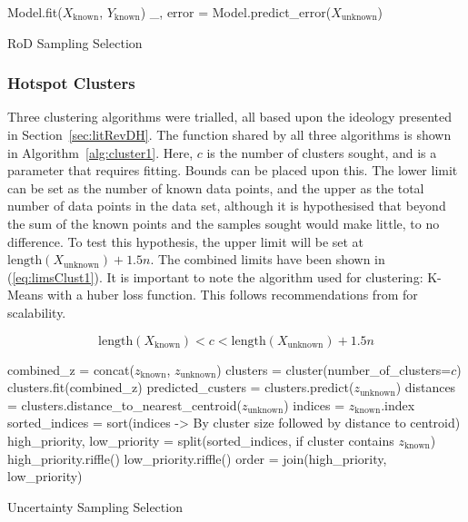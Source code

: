 \begin{algorithm}[H]
    Model.fit($X_\mathrm{known}$, $Y_\mathrm{known}$)\;
    \_, error = Model.predict\_error($X_\mathrm{unknown}$)\;
    \caption{RoD Sampling Selection}
    \label{alg:rod}\SetAlgoLined
\end{algorithm}

\subsubsection{Hotspot Clusters}
Three clustering algorithms were trialled, all based upon the ideology presented in Section~\ref{sec:litRevDH}. The function shared by all three algorithms is shown in Algorithm~\ref{alg:cluster1}. Here, $c$ is the number of clusters sought, and is a parameter that requires fitting. Bounds can be placed upon this. The lower limit can be set as the number of known data points, and the upper as the total number of data points in the data set, although it is hypothesised that beyond the sum of the known points and the samples sought would make little, to no difference. To test this hypothesis, the upper limit will be set at $\mathrm{length}(X_\mathrm{unknown})+1.5n$. The combined limits have been shown in (\ref{eq:limsClust1}). It is important to note the algorithm used for clustering: K-Means with a huber loss function. This follows recommendations from \textcite{SciClus} for scalability.

\begin{equation}
    \label{eq:limsClust1}
    {\mathrm{length}(X_\mathrm{known})<c<\mathrm{length}(X_\mathrm{unknown})+1.5n}
\end{equation}

\begin{algorithm}[H]
    combined\_z = concat($z_\mathrm{known}$, $z_\mathrm{unknown}$)\;
    clusters = cluster(number\_of\_clusters=$c$)\;
    clusters.fit(combined\_z)\;
    predicted\_custers = clusters.predict($z_\mathrm{unknown}$)\;
    distances = clusters.distance\_to\_nearest\_centroid($z_\mathrm{unknown}$)\;
    indices = $z_\mathrm{known}$.index\;
    sorted\_indices = sort(indices -> By cluster size followed by distance to centroid) \;
    high\_priority, low\_priority = split(sorted\_indices, if cluster contains $z_\mathrm{known}$)\;
    high\_priority.riffle()\;
    low\_priority.riffle()\;
    order = join(high\_priority, low\_priority)\;

    \caption{Uncertainty Sampling Selection}
    \label{alg:cluster1}\SetAlgoLined
\end{algorithm}

